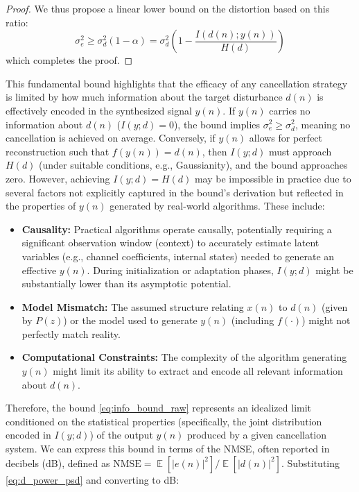 \documentclass{article}
\DeclareMathOperator{\E}{\mathbb{E}} %
\begin{document}
\begin{proof}
We thus propose a linear lower bound on the distortion based on this ratio:
\begin{equation}
\sigma_e^2 \geq \sigma_d^2 (1 - \alpha) = \sigma_d^2 \left(1 - \frac{I(d(n); y(n))}{H(d)}\right)
\end{equation}
which completes the proof.
\end{proof}




This fundamental bound highlights that the efficacy of any cancellation strategy is limited by how much information about the target disturbance \( d(n) \) is effectively encoded in the synthesized signal \( y(n) \). If \( y(n) \) carries no information about \( d(n) \) (\( I(y; d) = 0 \)), the bound implies \( \sigma_e^2 \geq \sigma_d^2 \), meaning no cancellation is achieved on average. Conversely, if \( y(n) \) allows for perfect reconstruction such that \( f(y(n)) = d(n) \), then \( I(y; d) \) must approach \( H(d) \) (under suitable conditions, e.g., Gaussianity), and the bound approaches zero. However, achieving \( I(y; d) = H(d) \) may be impossible in practice due to several factors not explicitly captured in the bound's derivation but reflected in the properties of \( y(n) \) generated by real-world algorithms. These include:
\begin{itemize}
    \item \textbf{Causality:} Practical algorithms operate causally, potentially requiring a significant observation window (context) to accurately estimate latent variables (e.g., channel coefficients, internal states) needed to generate an effective \( y(n) \). During initialization or adaptation phases, \( I(y; d) \) might be substantially lower than its asymptotic potential.
    \item \textbf{Model Mismatch:} The assumed structure relating \( x(n) \) to \( d(n) \) (given by \( P(z) \)) or the model used to generate \( y(n) \) (including \( f(\cdot) \)) might not perfectly match reality.
    \item \textbf{Computational Constraints:} The complexity of the algorithm generating \( y(n) \) might limit its ability to extract and encode all relevant information about \( d(n) \).
\end{itemize}
Therefore, the bound \eqref{eq:info_bound_raw} represents an idealized limit conditioned on the statistical properties (specifically, the joint distribution encoded in \( I(y; d) \)) of the output \( y(n) \) produced by a given cancellation system. We can express this bound in terms of the NMSE, often reported in decibels (dB), defined as \( \mathrm{NMSE} = \E[|e(n)|^2] / \E[|d(n)|^2] \). Substituting \eqref{eq:d_power_psd} and converting to dB:
\end{document}
